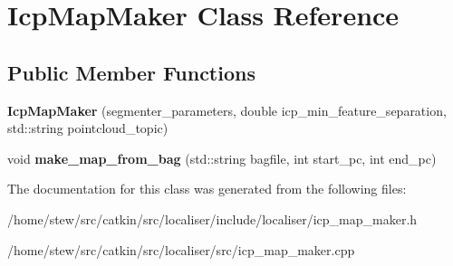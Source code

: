 \hypertarget{classIcpMapMaker}{}\section{Icp\+Map\+Maker Class Reference}
\label{classIcpMapMaker}
\subsection*{Public Member Functions}
\begin{DoxyCompactItemize}
\item 
\mbox{\label{classIcpMapMaker_affe5354fe0f7df47b16897cc55a25927}} 
{\bfseries Icp\+Map\+Maker} (segmenter\+\_\+parameters, double icp\+\_\+min\+\_\+feature\+\_\+separation, std\+::string pointcloud\+\_\+topic)
\item 
\mbox{\label{classIcpMapMaker_af1832143df89b9225f04f7c9e9467bd6}} 
void {\bfseries make\+\_\+map\+\_\+from\+\_\+bag} (std\+::string bagfile, int start\+\_\+pc, int end\+\_\+pc)
\end{DoxyCompactItemize}


The documentation for this class was generated from the following files\+:\begin{DoxyCompactItemize}
\item 
/home/stew/src/catkin/src/localiser/include/localiser/icp\+\_\+map\+\_\+maker.\+h\item 
/home/stew/src/catkin/src/localiser/src/icp\+\_\+map\+\_\+maker.\+cpp\end{DoxyCompactItemize}
